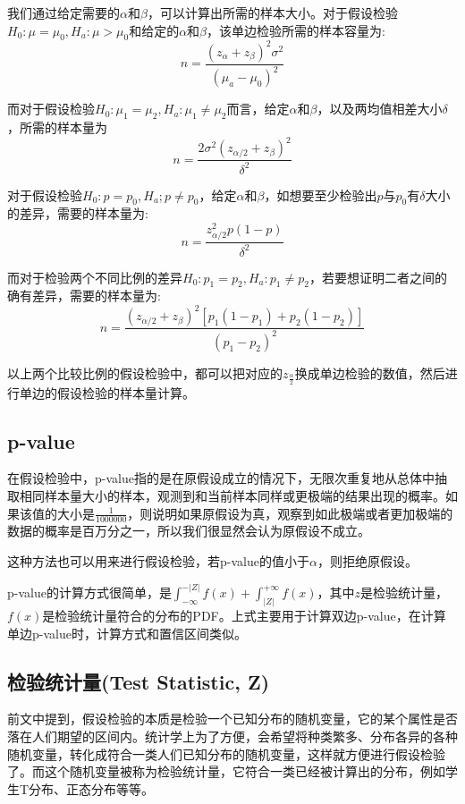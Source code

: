 \documentclass[UTF8]{ctexbook}
\begin{document}
\indent 我们通过给定需要的$\alpha$和$\beta$，可以计算出所需的样本大小。对于假设检验$H_0: \mu=\mu_0, H_a:\mu>\mu_0$和给定的$\alpha$和$\beta$，该单边检验所需的样本容量为:
\[
    n=\frac{\left(z_\alpha+z_\beta\right)^2\sigma^2}{\left(\mu_a-\mu_0\right)^2}
\]

而对于假设检验$H_0: \mu_1=\mu_2, H_a: \mu_1\neq\mu_2$而言，给定$\alpha$和$\beta$，以及两均值相差大小$\delta$，所需的样本量为
\[
    n=\frac{2\sigma^2\left(z_{\alpha/2}+z_\beta\right)^2}{\delta^2}
\]

对于假设检验$H_0: p=p_0, H_a; p\neq p_0$，给定$\alpha$和$\beta$，如想要至少检验出$p$与$p_0$有$\delta$大小的差异，需要的样本量为:
\[
    n=\frac{z_{\alpha/2}^2p(1-p)}{\delta^2}
\]

而对于检验两个不同比例的差异$H_0: p_1=p_2, H_a: p_1\neq p_2$，若要想证明二者之间的确有差异，需要的样本量为:
\[
    n=\frac{\left(z_{\alpha/2}+z_\beta\right)^2\left[p_1\left(1-p_1\right)+p_2\left(1-p_2\right)\right]}{\left(p_1-p_2\right)^2}
\]

以上两个比较比例的假设检验中，都可以把对应的$z_\frac{\alpha}{2}$换成单边检验的数值，然后进行单边的假设检验的样本量计算。

\subsection{p-value}
在假设检验中，p-value指的是在原假设成立的情况下，无限次重复地从总体中抽取相同样本量大小的样本，观测到和当前样本同样或更极端的结果出现的概率。如果该值的大小是$\frac{1}{1000000}$，则说明如果原假设为真，观察到如此极端或者更加极端的数据的概率是百万分之一，所以我们很显然会认为原假设不成立。

这种方法也可以用来进行假设检验，若p-value的值小于$\alpha$，则拒绝原假设。

p-value的计算方式很简单，是$\int_{-\infty}^{-|Z|}f(x)+\int_{|Z|}^{+\infty}f(x)$，其中$z$是检验统计量，$f(x)$是检验统计量符合的分布的PDF。上式主要用于计算双边p-value，在计算单边p-value时，计算方式和置信区间类似。

\subsection{检验统计量(Test Statistic, Z)}
前文中提到，假设检验的本质是检验一个已知分布的随机变量，它的某个属性是否落在人们期望的区间内。统计学上为了方便，会希望将种类繁多、分布各异的各种随机变量，转化成符合一类人们已知分布的随机变量，这样就方便进行假设检验了。而这个随机变量被称为检验统计量，它符合一类已经被计算出的分布，例如学生T分布、正态分布等等。
\end{document}

